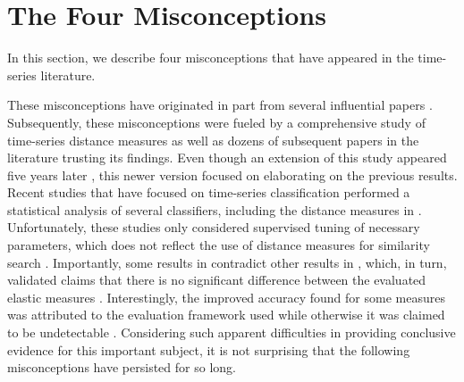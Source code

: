\documentclass[11pt]{article}
\begin{document}
\section{The Four Misconceptions}
\label{john_sec:perceptions}

In this section, we describe four misconceptions that have appeared in the time-series literature. 

These misconceptions have originated in part from several influential papers \cite{agrawal1993,Faloutsos1994fast,goldin1995similarity,berndt1994using,shieh2008sax}. Subsequently, these misconceptions were fueled by a comprehensive study of time-series distance measures \cite{ding2008querying} as well as dozens of subsequent papers in the literature trusting its findings. Even though an extension of this study appeared five years later \cite{wang2013experimental}, this newer version focused on elaborating on the previous results. %
Recent studies that have focused on time-series classification \cite{bagnall2017great,lines2015time} performed a statistical analysis of several classifiers, including the distance measures in \cite{ding2008querying,wang2013experimental}. Unfortunately, these studies only considered supervised tuning of necessary parameters, which does not reflect the use of distance measures for similarity search \cite{echihabi2018lernaean}. Importantly, some results in \cite{bagnall2017great} contradict other results in \cite{lines2015time}, which, in turn, validated claims that there is no significant difference between the evaluated elastic measures \cite{ding2008querying,wang2013experimental}. Interestingly, the improved accuracy found for some measures was attributed to the evaluation framework used while otherwise it was claimed to be undetectable \cite{bagnall2017great}. Considering such apparent difficulties in providing conclusive evidence for this important subject, it is not surprising that the following misconceptions have persisted for so long. 
\end{document}
